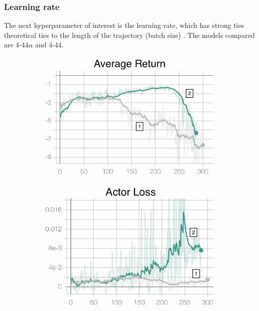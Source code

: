 \subsubsection{Learning rate}
The next hyperparameter of interest is the learning rate, which has strong ties theoretical ties to the length of the trajectory (batch size) \cite{batchsizeInvariance,dontdecayLRIncreaseBatch,ImageNet1Hour}. The models compared are 4-44$\alpha$ and 4-44. 
\begin{figure}[hbt]
     \centering
     \begin{subfigure}[b]{0.32\textwidth}
         \centering
         \includegraphics[width=\textwidth]{figures/5_/Training/ppo_learningRateAvgReturn.png}
         \caption{}
         \label{fig:5_training_ppo_learningRateAvgReturn}
     \end{subfigure} 
     \hfill
     \begin{subfigure}[b]{0.32\textwidth}
         \centering
         \includegraphics[width=\textwidth]{figures/5_/Training/ppo_learningRateActorL.png}

\end{subfigure}
\end{figure}
